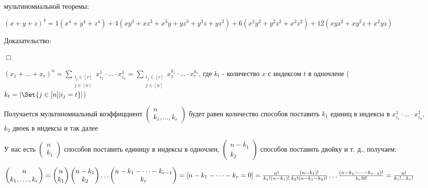 \documentclass[12pt]{article}
\begin{document}

    \Ex мультиномиальной теоремы:

    $(x + y + z)^4 = 1 (x^4 + y^4 + z^4) + 4 (xy^3 + xz^3 + x^3y + yz^3 + y^3z + yz^3) +
    6(x^2y^2 + y^2z^2 + x^2z^2) + 12 (xyz^2 + xy^2z + x^2yz)$

    Доказательство:

    $\Box$

    $(x_1 + \dots + x_r)^n = \sum_{\substack{i_j \in [r] \\ j \in [n]}} x_{i_1}^1 \cdot \dots \cdot x_{i_n}^1 =
    \sum_{\substack{i_j \in [r] \\ j \in [n]}} x_1^{k_1} \cdot \dots \cdot x_r^{k_r}$, где $k_t$ - количество $x$ с индексом $t$ в одночлене ($k_t = |\Set{j \in [n] | i_j = t}|$)

    Получается мультиномиальный коэффицциент $\begin{pmatrix}
                                                  n \\ k_1, \dots, k_r
    \end{pmatrix}$
    будет равен количество способов поставить $k_1$ единиц в индексы в $x_{i_1}^1 \cdot \dots \cdot x_{i_n}^1$, $k_2$ двоек в индексы и так далее

    У нас есть $\begin{pmatrix}
                    n \\ k_1
    \end{pmatrix}$ способов поставить единицу в индексы в одночлен,
    $\begin{pmatrix}
         n - k_1 \\ k_2
    \end{pmatrix}$ способов поставить двойку и т. д., получаем:

    $\begin{pmatrix}
         n \\ k_1, \dots, k_r
    \end{pmatrix} = \begin{pmatrix}
                        n \\ k_1
    \end{pmatrix} \begin{pmatrix}
                      n - k_1 \\ k_2
    \end{pmatrix} \dots \begin{pmatrix}
                            n - k_1 - \dots - k_{r - 1} \\ k_r
    \end{pmatrix} = [n - k_1 - \dots - k_r = 0] = \\
    \frac{n!}{k_1! (n - k_1)!} \frac{(n - k_1)!}{k_2! (n - k_1 - k_2)!} \dots \frac{(n - k_1 - \dots - k_{r - 1})!}{k_r! 0!} = \frac{n!}{k_1! \dots k_r!}$
\end{document}
